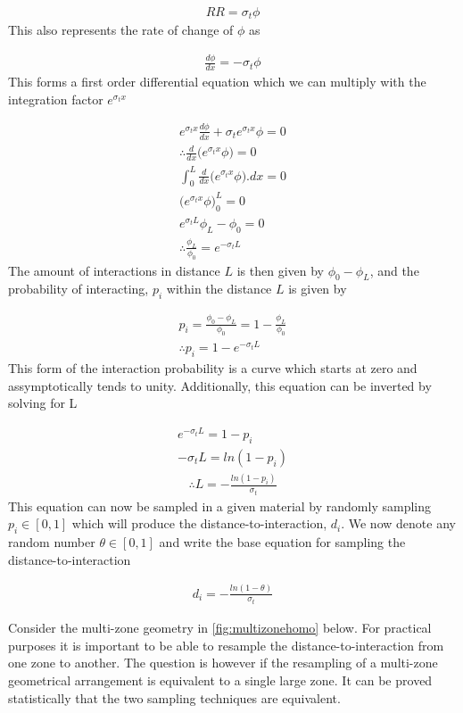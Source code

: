 \documentclass[11pt,letterpaper,titlepage]{article}
\newcommand{\beq}{\begin{equation*}
\begin{aligned}}
\newcommand{\eeq}{\end{aligned}
\end{equation*}}
\newcommand{\beqn}{\begin{equation}
	\begin{aligned}}
\newcommand{\eeqn}{\end{aligned}
	\end{equation}}
\numberwithin{equation}{section}
\begin{document}
\beq
RR = \sigma_t \phi
\eeq
\newline
This also represents the rate of change of $\phi$ as

\beq
\frac{d\phi}{dx} = - \sigma_t \phi
\eeq
\newline
This forms a first order differential equation which we can multiply with the integration factor $e^{\sigma_t x}$

\beq
e^{\sigma_t x} \frac{d\phi}{dx} + \sigma_t e^{\sigma_t x} \phi = 0 \\
\therefore
\frac{d}{dx} \biggr(  e^{\sigma_t x} \phi \biggr) = 0 \\
\int_0^L \frac{d}{dx} \biggr(  e^{\sigma_t x} \phi \biggr).dx = 0 \\
\biggr(  e^{\sigma_t x} \phi \biggr)_0^L = 0\\
e^{\sigma_t L}\phi_L - \phi_0 = 0 \\
\therefore 
\frac{\phi_L}{\phi_0} = e^{-\sigma_t L}
\eeq
\newline
The amount of interactions in distance $L$ is then given by $\phi_0 - \phi_L$, and the probability of interacting, $p_i$ within the distance $L$ is given by

\beq 
p_i = \frac{\phi_0-\phi_L}{\phi_0} = 1 - \frac{\phi_L}{\phi_0} \\
\therefore
p_i = 1 - e^{-\sigma_t L}
\eeq 
\newline
This form of the interaction probability is a curve which starts at zero and assymptotically tends to unity. Additionally, this equation can be inverted by solving for L

\beq
e^{-\sigma_t L} = 1 - p_i \\
-\sigma_t L = ln(1-p_i) 
\eeq 
\beqn
\therefore
L = -\frac{ln(1-p_i)}{\sigma_t}
\eeqn
\newline
This equation can now be sampled in a given material by randomly sampling $p_i \in [0,1]$ which will produce the distance-to-interaction, $d_i$. We now denote any random number $\theta \in [0,1]$ and write the base equation for sampling the distance-to-interaction

\beqn
d_i = -\frac{ln(1-\theta)}{\sigma_t}
\eeqn  

\vspace{0.5cm}
Consider the multi-zone geometry in \ref{fig:multizonehomo} below. For practical purposes it is important to be able to resample the distance-to-interaction from one zone to another. The question is however if the resampling of a multi-zone geometrical arrangement is equivalent to a single large zone. It can be proved statistically that the two sampling techniques are equivalent.
\end{document}
